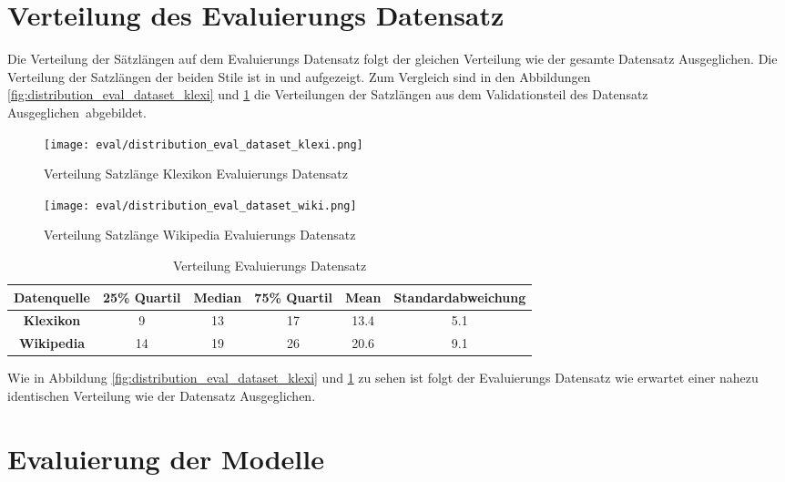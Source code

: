 \section{Verteilung des Evaluierungs Datensatz}
\label{sec:distri_eval_data}

Die Verteilung der Sätzlängen auf dem Evaluierungs Datensatz folgt der gleichen Verteilung wie der gesamte Datensatz
\flqq Ausgeglichen\frqq. Die Verteilung der Satzlängen der beiden Stile ist in  und
 aufgezeigt. Zum Vergleich sind in den Abbildungen \ref{fig:distribution_eval_dataset_klexi}
und \ref{fig:distribution_eval_dataset_wiki} die Verteilungen der Satzlängen aus dem Validationsteil des Datensatz \flqq
Ausgeglichen\frqq \ abgebildet.

\begin{figure}[H]
      \texttt{[image: eval/distribution\_eval\_dataset\_klexi.png]}
      \caption{Verteilung Satzlänge Klexikon Evaluierungs Datensatz}\label{fig:distribution_eval_dataset_klexi}
    \endminipage\hfill
      \texttt{[image: eval/distribution\_eval\_dataset\_wiki.png]}
      \caption{Verteilung Satzlänge Wikipedia Evaluierungs Datensatz}\label{fig:distribution_eval_dataset_wiki}
    \endminipage\hfill      
 \end{figure}
 \begin{table}[H]
    \centering
    \begin{tabular}{|c|c|c|c|c|c|}
      \hline
      \textbf{Datenquelle}& \textbf{25\% Quartil}& \textbf{Median}& \textbf{75\% Quartil} & \textbf{Mean} &
      \textbf{Standardabweichung}\\
      \hline
      \textbf{Klexikon}& 9 & 13 & 17 & 13.4 & 5.1\\
      \hline
      \textbf{Wikipedia}& 14 & 19 & 26 & 20.6 & 9.1\\
      \hline
    \end{tabular}
    \caption{Verteilung Evaluierungs Datensatz}
    \label{tab:distribution_eval_dataset}
  \end{table}  
\noindent
Wie in Abbildung \ref{fig:distribution_eval_dataset_klexi} und \ref{fig:distribution_eval_dataset_wiki} zu sehen ist
folgt der Evaluierungs Datensatz wie erwartet einer nahezu identischen Verteilung wie der Datensatz \flqq Ausgeglichen\frqq.

\section{Evaluierung der Modelle}
\label{sec:eval-eval}

